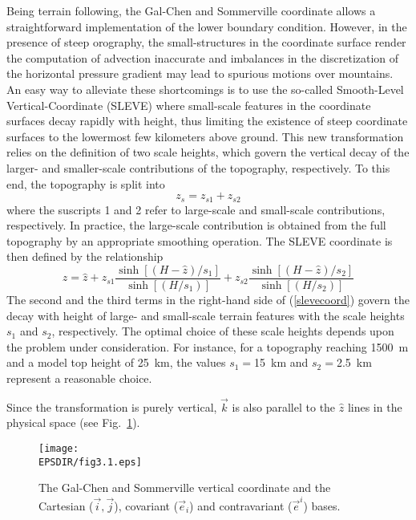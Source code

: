 Being terrain following, the Gal-Chen and Sommerville coordinate allows a
straightforward implementation of the lower boundary condition. However,
in the presence of steep orography, the small-structures in the coordinate 
surface render the computation of advection inaccurate and imbalances in
the discretization of the horizontal pressure gradient may lead to spurious 
motions over mountains. An easy way to alleviate these shortcomings is to 
use the so-called Smooth-Level Vertical-Coordinate (SLEVE) where small-scale
features in the coordinate surfaces decay rapidly with height, thus limiting
the existence of steep coordinate surfaces to the lowermost few kilometers
above ground. This new transformation relies on the definition of two scale 
heights, which govern the vertical decay of the larger- and smaller-scale
contributions of the topography, respectively. To this end, the topography is
split into
\begin{equation}
z_s = z_{s1} +z_{s2}
\end{equation}
where the suscripts 1 and 2 refer to large-scale and small-scale contributions,
respectively. In practice, the large-scale contribution is obtained from the 
full topography by an appropriate smoothing operation. The SLEVE coordinate 
is then defined by the relationship 
\begin{equation}\label{slevecoord}
 z=  \hat z 
+ z_{s1} \frac {\sinh [(H-\hat z)/s_1]} {\sinh [(H/s_1)]}
+ z_{s2} \frac {\sinh [(H-\hat z)/s_2]} {\sinh [(H/s_2)]}
\end{equation}
The second and the third terms in the right-hand side of (\ref{slevecoord})
govern the decay with height of large- and small-scale terrain features 
with the scale heights $s_1$ and $s_2$, respectively.
The optimal choice of these scale 
heights depends upon the problem under consideration. For instance, for a 
topography reaching 1500~m and a model top height of 25~km, the values 
$s_1=$15~km and $s_2=$2.5~km represent a reasonable choice.

Since the transformation is purely vertical, $\vec{k}$
is also parallel to the $\widehat{z}$ lines in the physical space
(see Fig.~\ref{galchen}).

\begin{figure}[!ht]
\centerline{\texttt{[image: \\EPSDIR/fig3.1.eps]}}
\caption{The Gal-Chen and Sommerville vertical coordinate and the Cartesian
($\vec{i},\vec{j}$), covariant ($\vec{e}_i$) and contravariant ($\vec{e}^i$)
bases.}
\label{galchen}
\end{figure}

